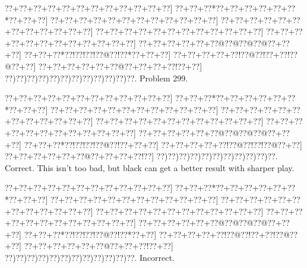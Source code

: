 \documentclass[a5paper]{article}
\begin{document}
\newpage
\begin{center}
{\goo
\0??+\0??+\0??+\0??+\0??+\0??+\0??+\0??+\0??+\0??+\0??+\0??]
\0??+\0??+\0??*\0??+\0??+\0??+\0??+\0??+\0??*\0??+\0??+\0??]
\0??+\0??+\0??+\0??+\0??+\0??+\0??+\0??+\0??+\0??+\0??+\0??]
\0??+\0??+\0??+\0??+\0??+\0??+\0??+\0??+\0??+\0??+\0??+\0??]
\0??+\0??+\0??+\0??+\0??+\0??+\0??+\0??+\0??+\0??+\0??+\0??]
\0??+\0??+\0??+\0??+\0??+\0??+\0??+\0??+\0??+\0??+\0??+\0??]
\0??+\0??+\0??+\0??+\0??+\0??@\0??@\0??@\0??@\0??+\0??+\0??]
\0??+\0??+\0??*\0??!\0??!\0??!\0??@\0??!\0??*\0??+\0??+\0??]
\0??+\0??+\0??+\0??+\0??!\0??@\0??!\0??+\0??!\0??@\0??+\0??]
\0??+\0??+\0??+\0??+\0??+\0??@\0??+\0??+\0??+\0??!\0??+\0??]
\0??)\0??)\0??)\0??)\0??)\0??)\0??)\0??)\0??)\0??)\0??)\0??.
}
Problem 299.

\end{center}
\begin{center}
{\goo
\0??+\0??+\0??+\0??+\0??+\0??+\0??+\0??+\0??+\0??+\0??+\0??]
\0??+\0??+\0??*\0??+\0??+\0??+\0??+\0??+\0??*\0??+\0??+\0??]
\0??+\0??+\0??+\0??+\0??+\0??+\0??+\0??+\0??+\0??+\0??+\0??]
\0??+\0??+\0??+\0??+\0??+\0??+\0??+\0??+\0??+\0??+\0??+\0??]
\0??+\0??+\0??+\0??+\0??+\0??+\0??+\0??+\0??+\0??+\0??+\0??]
\0??+\0??+\0??+\0??+\0??+\0??+\0??+\0??+\0??+\0??+\0??+\0??]
\0??+\0??+\0??+\0??+\0??+\0??@\0??@\0??@\0??@\0??+\0??+\0??]
\0??+\0??+\0??*\0??!\0??!\0??!\0??@\0??!\0??+\0??+\0??]
\0??+\0??+\0??+\0??+\0??!\0??@\0??!\0??!\0??@\0??+\0??]
\0??+\0??+\0??+\0??+\0??+\0??@\0??+\0??+\0??+\0??!\0??]
\0??)\0??)\0??)\0??)\0??)\0??)\0??)\0??)\0??)\0??)\0??.
}
Correct. This isn't too bad, but black can get a better result with sharper play.

\end{center}
\begin{center}
{\goo
\0??+\0??+\0??+\0??+\0??+\0??+\0??+\0??+\0??+\0??+\0??+\0??]
\0??+\0??+\0??*\0??+\0??+\0??+\0??+\0??+\0??*\0??+\0??+\0??]
\0??+\0??+\0??+\0??+\0??+\0??+\0??+\0??+\0??+\0??+\0??+\0??]
\0??+\0??+\0??+\0??+\0??+\0??+\0??+\0??+\0??+\0??+\0??+\0??]
\0??+\0??+\0??+\0??+\0??+\0??+\0??+\0??+\0??+\0??+\0??+\0??]
\0??+\0??+\0??+\0??+\0??+\0??+\0??+\0??+\0??+\0??+\0??+\0??]
\0??+\0??+\0??+\0??+\0??+\0??@\0??@\0??@\0??@\0??+\0??+\0??]
\0??+\0??+\0??*\0??!\0??!\0??!\0??@\0??!\0??*\0??+\0??]
\0??+\0??+\0??+\0??+\0??!\0??@\0??!\0??+\0??!\0??@\0??+\0??]
\0??+\0??+\0??+\0??+\0??+\0??@\0??+\0??+\0??!\0??+\0??]
\0??)\0??)\0??)\0??)\0??)\0??)\0??)\0??)\0??)\0??)\0??)\0??.
}
Incorrect. 

\end{center}
\newpage
\end{document}
